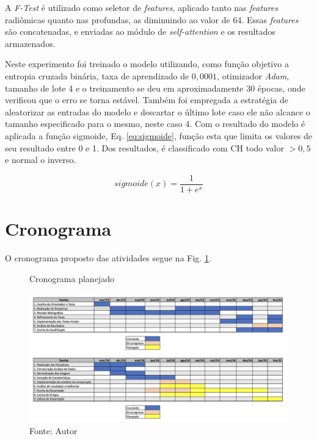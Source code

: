 A \textit{F-Test} é utilizado como seletor de \textit{features}, aplicado tanto nas \textit{features} radiômicas quanto nas profundas, as diminuindo ao valor de 64. Essas \textit{features} são concatenadas, e enviadas ao módulo de \textit{self-attention} e os resultados armazenados.

Neste experimento foi treinado o modelo utilizando, como função objetivo a entropia cruzada binária, taxa de aprendizado de $0,0001$, otimizador \textit{Adam}, tamanho de lote 4 e o treinamento se deu em aproximadamente 30 épocas, onde verificou que o erro se torna estável. Também foi empregada a estratégia de aleatorizar as entradas do modelo e descartar o último lote caso ele não alcance o tamanho especificado para o mesmo, neste caso 4. Com o resultado do modelo é aplicada a função sigmoide, Eq. \ref{eq:sigmoide}, função esta que limita os valores de seu resultado entre 0 e 1. Dos resultados, é classificado com CH todo valor $>0,5$ e normal o inverso.

\begin{equation}
\textit{sigmoide}(x) = \frac{1}{1 + e^x}
\label{eq:sigmoide}
\end{equation}

\section{Cronograma}
\label{sec:cronograma}

O cronograma proposto das atividades segue na Fig. \ref{fig:fig014}.

\begin{figure}[htbp]
    \centering
    \caption{Cronograma planejado}
    \includegraphics[width=1\textwidth]{figures/fig014.png}
    \caption*{Fonte: Autor}
    \label{fig:fig014}
\end{figure}
